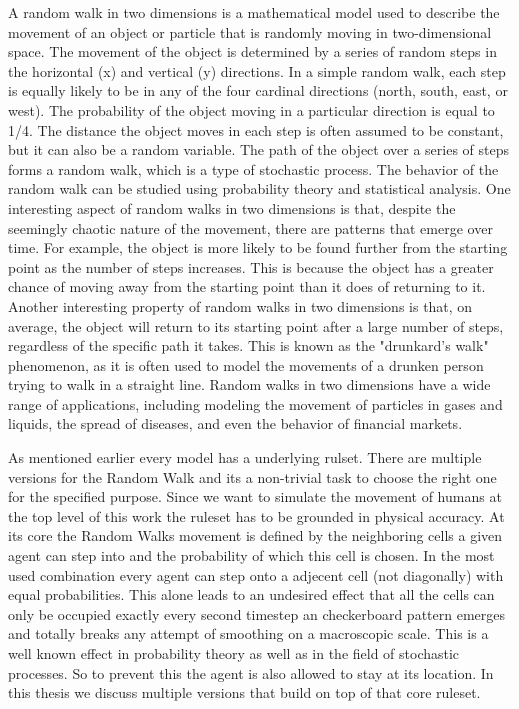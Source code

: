 A random walk in two dimensions is a mathematical model used to describe the movement of an object or particle that is randomly moving in two-dimensional space. The movement of the object is determined by a series of random steps in the horizontal (x) and vertical (y) directions.
In a simple random walk, each step is equally likely to be in any of the four cardinal directions (north, south, east, or west). The probability of the object moving in a particular direction is equal to 1/4. The distance the object moves in each step is often assumed to be constant, but it can also be a random variable.
The path of the object over a series of steps forms a random walk, which is a type of stochastic process. The behavior of the random walk can be studied using probability theory and statistical analysis.
One interesting aspect of random walks in two dimensions is that, despite the seemingly chaotic nature of the movement, there are patterns that emerge over time. For example, the object is more likely to be found further from the starting point as the number of steps increases. This is because the object has a greater chance of moving away from the starting point than it does of returning to it.
Another interesting property of random walks in two dimensions is that, on average, the object will return to its starting point after a large number of steps, regardless of the specific path it takes. This is known as the "drunkard's walk" phenomenon, as it is often used to model the movements of a drunken person trying to walk in a straight line.
Random walks in two dimensions have a wide range of applications, including modeling the movement of particles in gases and liquids, the spread of diseases, and even the behavior of financial markets.

As mentioned earlier every model has a underlying rulset. There are multiple versions for the Random Walk and its a non-trivial task to choose the right one for the specified purpose. 
Since we want to simulate the movement of humans at the top level of this work the ruleset has to be grounded in physical accuracy. 
At its core the Random Walks movement is defined by the neighboring cells a given agent can step into and the probability of which this cell is chosen. 
In the most used combination every agent can step onto a adjecent cell (not diagonally) with equal probabilities.
This alone leads to an undesired effect that all the cells can only be occupied exactly every second timestep an checkerboard pattern emerges and totally breaks any attempt of smoothing on a macroscopic scale. 
This is a well known effect in probability theory as well as in the field of stochastic processes.
So to prevent this the agent is also allowed to stay at its location. 
In this thesis we discuss multiple versions that build on top of that core ruleset. 

